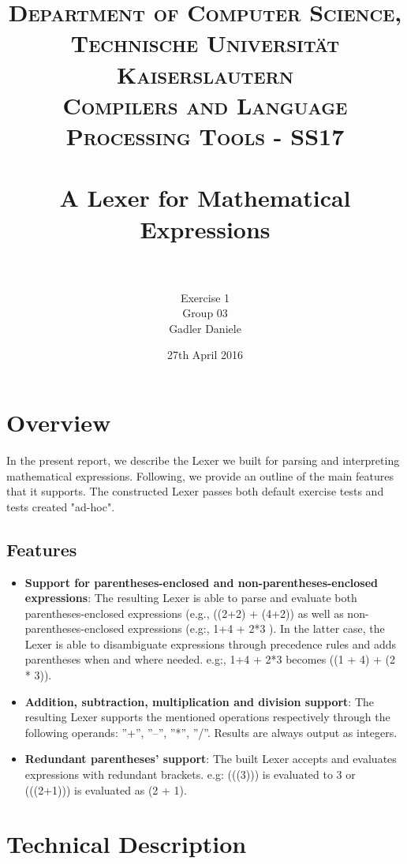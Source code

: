 \documentclass[paper=a4, fontsize=11pt]{scrartcl}
\title{
		\usefont{OT1}{bch}{b}{n}
		\normalfont \normalsize \textsc{Department of Computer Science, Technische Universit\"at Kaiserslautern\\
Compilers and Language Processing Tools - SS17
		} \\ [25pt]
		\horrule{0.5pt} \\[0.4cm]
		\huge A Lexer for Mathematical Expressions\\
		\horrule{2pt} \\[0.5cm]
}
\author{	
		Exercise 1\\
		Group 03\\
        Gadler Daniele\\[-1pt]		\normalsize
}
\date{27th April 2016}
\numberwithin{equation}{section}		%
\numberwithin{figure}{section}			%
\numberwithin{table}{section}				%
\begin{document}
\maketitle

\section{Overview}
In the present report, we describe the Lexer we built for parsing and interpreting mathematical expressions. Following, we provide an outline of the main features that it supports. The constructed Lexer passes both default exercise tests and tests created "ad-hoc".
\subsection*{Features}

\begin{itemize}
	\item \textbf{Support for parentheses-enclosed and non-parentheses-enclosed expressions}: The resulting Lexer is able to parse and evaluate both parentheses-enclosed expressions (e.g., ((2+2) + (4+2)) as well as non-parentheses-enclosed expressions (e.g:, 1+4 + 2*3 ). In the latter case, the Lexer is able to disambiguate expressions through precedence rules and adds parentheses when and where needed. e.g:, 1+4 + 2*3 becomes ((1 + 4) + (2 * 3)).
	\item \textbf{Addition, subtraction, multiplication and division support}: The resulting Lexer supports the mentioned operations respectively through the following operands: ''+'', ''--'', ''*'', ''/''. Results are always output as integers. 
	\item \textbf{Redundant parentheses' support}: The built Lexer accepts and evaluates expressions with redundant brackets. e.g: (((3))) is evaluated to 3 or (((2+1))) is evaluated as (2 + 1).
\end{itemize}


\section{Technical Description}

\end{document}

